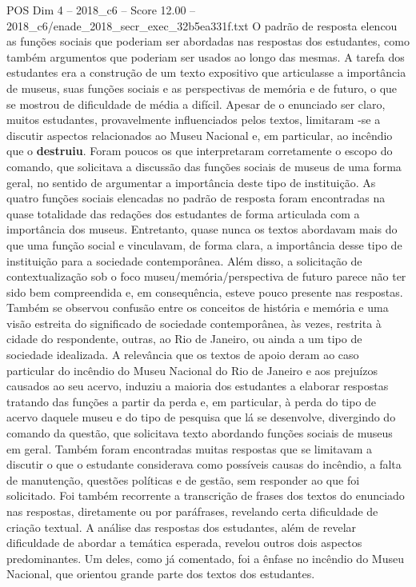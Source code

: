\begin{textsample}{POS Dim 4 – 2018\_c6 – Score 12.00 – 2018\_c6/enade\_2018\_secr\_exec\_32b5ea331f.txt}
O padrão de resposta elencou as funções sociais que poderiam ser abordadas nas respostas dos estudantes, como também argumentos que poderiam ser usados ao longo das mesmas.
A tarefa dos estudantes era a construção de um texto expositivo que articulasse a importância de museus, suas funções sociais e as perspectivas de memória e de futuro, o que se mostrou de dificuldade de média a difícil.
Apesar de o enunciado ser claro, muitos estudantes, provavelmente influenciados pelos textos, limitaram -se a discutir aspectos relacionados ao Museu Nacional e, em particular, ao incêndio que o \textbf{destruiu}.
Foram poucos os que interpretaram corretamente o escopo do comando, que solicitava a discussão das funções sociais de museus de uma forma geral, no sentido de argumentar a importância deste tipo de instituição.
As quatro funções sociais elencadas no padrão de resposta foram encontradas na quase totalidade das redações dos estudantes de forma articulada com a importância dos museus.
Entretanto, quase nunca os textos abordavam mais do que uma função social e vinculavam, de forma clara, a importância desse tipo de instituição para a sociedade contemporânea.
Além disso, a solicitação de contextualização sob o foco museu/memória/perspectiva de futuro parece não ter sido bem compreendida e, em consequência, esteve pouco presente nas respostas.
Também se observou confusão entre os conceitos de história e memória e uma visão estreita do significado de sociedade contemporânea, às vezes, restrita à cidade do respondente, outras, ao Rio de Janeiro, ou ainda a um tipo de sociedade idealizada.
A relevância que os textos de apoio deram ao caso particular do incêndio do Museu Nacional do Rio de Janeiro e aos prejuízos causados ao seu acervo, induziu a maioria dos estudantes a elaborar respostas tratando das funções a partir da perda e, em particular, à perda do tipo de acervo daquele museu e do tipo de pesquisa que lá se desenvolve, divergindo do comando da questão, que solicitava texto abordando funções sociais de museus em geral.
Também foram encontradas muitas respostas que se limitavam a discutir o que o estudante considerava como possíveis causas do incêndio, a falta de manutenção, questões políticas e de gestão, sem responder ao que foi solicitado.
Foi também recorrente a transcrição de frases dos textos do enunciado nas respostas, diretamente ou por paráfrases, revelando certa dificuldade de criação textual.
A análise das respostas dos estudantes, além de revelar dificuldade de abordar a temática esperada, revelou outros dois aspectos predominantes.
Um deles, como já comentado, foi a ênfase no incêndio do Museu Nacional, que orientou grande parte dos textos dos estudantes.

\end{textsample}
